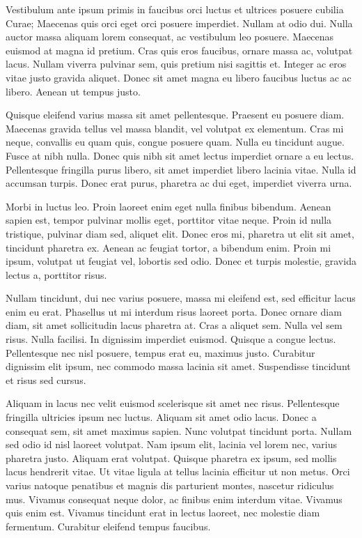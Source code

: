 Vestibulum ante ipsum primis in faucibus orci luctus et ultrices posuere cubilia Curae; Maecenas quis orci eget orci posuere imperdiet. Nullam at odio dui. Nulla auctor massa aliquam lorem consequat, ac vestibulum leo posuere. Maecenas euismod at magna id pretium. Cras quis eros faucibus, ornare massa ac, volutpat lacus. Nullam viverra pulvinar sem, quis pretium nisi sagittis et. Integer ac eros vitae justo gravida aliquet. Donec sit amet magna eu libero faucibus luctus ac ac libero. Aenean ut tempus justo.

Quisque eleifend varius massa sit amet pellentesque. Praesent eu posuere diam. Maecenas gravida tellus vel massa blandit, vel volutpat ex elementum. Cras mi neque, convallis eu quam quis, congue posuere quam. Nulla eu tincidunt augue. Fusce at nibh nulla. Donec quis nibh sit amet lectus imperdiet ornare a eu lectus. Pellentesque fringilla purus libero, sit amet imperdiet libero lacinia vitae. Nulla id accumsan turpis. Donec erat purus, pharetra ac dui eget, imperdiet viverra urna.

Morbi in luctus leo. Proin laoreet enim eget nulla finibus bibendum. Aenean sapien est, tempor pulvinar mollis eget, porttitor vitae neque. Proin id nulla tristique, pulvinar diam sed, aliquet elit. Donec eros mi, pharetra ut elit sit amet, tincidunt pharetra ex. Aenean ac feugiat tortor, a bibendum enim. Proin mi ipsum, volutpat ut feugiat vel, lobortis sed odio. Donec et turpis molestie, gravida lectus a, porttitor risus.

Nullam tincidunt, dui nec varius posuere, massa mi eleifend est, sed efficitur lacus enim eu erat. Phasellus ut mi interdum risus laoreet porta. Donec ornare diam diam, sit amet sollicitudin lacus pharetra at. Cras a aliquet sem. Nulla vel sem risus. Nulla facilisi. In dignissim imperdiet euismod. Quisque a congue lectus. Pellentesque nec nisl posuere, tempus erat eu, maximus justo. Curabitur dignissim elit ipsum, nec commodo massa lacinia sit amet. Suspendisse tincidunt et risus sed cursus.

Aliquam in lacus nec velit euismod scelerisque sit amet nec risus. Pellentesque fringilla ultricies ipsum nec luctus. Aliquam sit amet odio lacus. Donec a consequat sem, sit amet maximus sapien. Nunc volutpat tincidunt porta. Nullam sed odio id nisl laoreet volutpat. Nam ipsum elit, lacinia vel lorem nec, varius pharetra justo. Aliquam erat volutpat. Quisque pharetra ex ipsum, sed mollis lacus hendrerit vitae. Ut vitae ligula at tellus lacinia efficitur ut non metus. Orci varius natoque penatibus et magnis dis parturient montes, nascetur ridiculus mus. Vivamus consequat neque dolor, ac finibus enim interdum vitae. Vivamus quis enim est. Vivamus tincidunt erat in lectus laoreet, nec molestie diam fermentum. Curabitur eleifend tempus faucibus.

